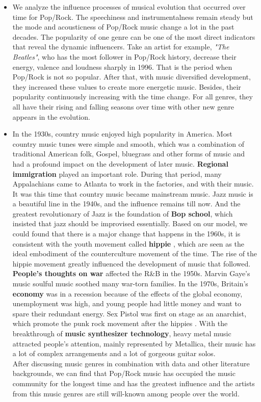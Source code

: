 \documentclass[12pt]{article}
\begin{document}
\begin{itemize}
\item We analyze the influence processes of musical evolution that occurred over time for Pop/Rock. The speechiness and instrumentalness remain steady but the mode and acousticness of Pop/Rock music change a lot in the past decades. The popularity of one genre can be one of the most direct indicators that reveal the dynamic influencers. Take an artist for example, \emph{"The Beatles"}, who has the most follower in Pop/Rock history, decrease their energy, valence and loudness sharply in 1996. That is the period when Pop/Rock is not so popular. After that, with music diversified development, they increased these values to create more energetic music. Besides, their popularity continuously increasing with the time change. For all genres, they all have their rising and falling seasons over time with other new genre appears in the evolution. 

\item In the 1930s, country music enjoyed high popularity in America. Most country music tunes were simple and smooth, which was a combination of traditional American folk, Gospel, bluegrass and other forms of music and had a profound impact on the development of later music. \textbf{Regional immigration} played an important role. During that period, many Appalachians came to Atlanta to work in the factories, and with their music. It was this time that country music became mainstream music. Jazz music is a beautiful line in the 1940s, and the influence remains till now. And the greatest revolutionary of Jazz is the foundation of \textbf{Bop school}, which insisted that jazz should be improvised essentially. Based on our model, we could found that there is a major change that happens in the 1960s, it is consistent with the youth movement called \textbf{hippie} \cite{article11}, which are seen as the ideal embodiment of the counterculture movement of the time. The rise of the hippie movement greatly influenced the development of music that followed. \textbf{People's thoughts on war} affected the R\&B in the 1950s. Marvin Gaye's music soulful music soothed many war-torn families. In the 1970s, Britain's \textbf{economy} was in a recession because of the effects of the global economy, unemployment was high, and young people had little money and want to spare their redundant energy. Sex Pistol was first on stage as an anarchist, which promote the punk rock movement after the hippies \cite{article10}. With the breakthrough of \textbf{music synthesizer technology}, heavy metal music attracted people's attention, mainly represented by Metallica, their music has a lot of complex arrangements and a lot of gorgeous guitar solos.\\
After discussing music genres in combination with data and other literature backgrounds, we can find that Pop/Rock music has occupied the music community for the longest time and has the greatest influence and the artists from this music genres are still will-known among people over the world.
\end{itemize}
\end{document}
